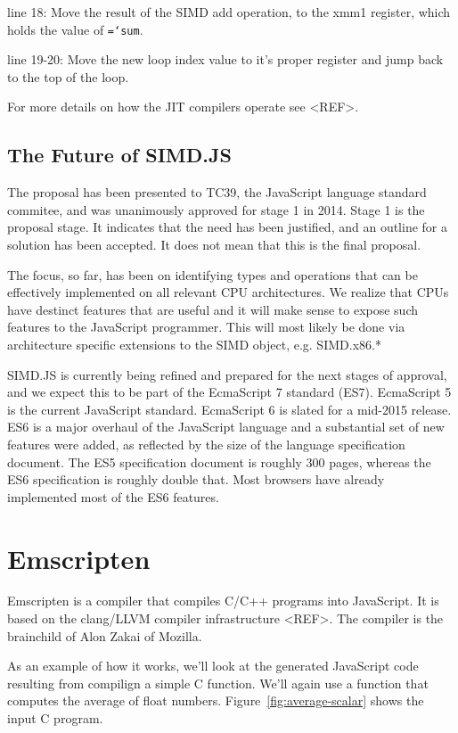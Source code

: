 \documentclass[preprint]{sigplanconf}
\newcommand{\ttt}[1]{{\texttt{\hyphenchar\font=`\-\relax #1}}}%
\begin{document}
line 18: Move the result of the SIMD add operation, to the xmm1 register, which
holds the value of \ttt{sum}.

line 19-20: Move the new loop index value to it's proper register and jump back
to the top of the loop.

For more details on how the JIT compilers operate see <REF>.

\subsection{The Future of SIMD.JS}

The proposal has been presented to TC39, the JavaScript language standard
commitee, and was unanimously approved for stage 1 in 2014.  Stage 1 is the
proposal stage.  It indicates that the need has been justified, and an 
outline for a solution has been accepted.  It does not mean that this is the final
proposal.

The focus, so far, has been on identifying types and operations that can be
effectively implemented on all relevant CPU architectures.  We realize that CPUs
have destinct features that are useful and it will make sense to expose such 
features to the JavaScript programmer.  This will most likely be done via
architecture specific extensions to the SIMD object, e.g. SIMD.x86.*

SIMD.JS is currently being refined and prepared for the next stages of approval,
and we expect this to be part of the EcmaScript 7 standard (ES7).
EcmaScript 5 is the current JavaScript standard.  EcmaScript 6 is slated for a
mid-2015 release. ES6 is a major overhaul of the JavaScript language and a 
substantial set of new features were added, as reflected by the size of the 
language specification document.  The ES5 specification document is roughly 300 
pages, whereas the ES6 specification is roughly double that. Most browsers 
have already implemented most of the ES6 features.

\section{Emscripten}

Emscripten is a compiler that compiles C/C++ programs into JavaScript.  It is
based on the clang/LLVM compiler infrastructure <REF>.  The compiler is the
brainchild of Alon Zakai of Mozilla.

As an example of how it works, we'll look at the generated JavaScript code
resulting from compilign a simple C function.  We'll again use a function that
computes the average of float numbers.  Figure~\ref{fig:average-scalar} shows
the input C program.
\end{document}
